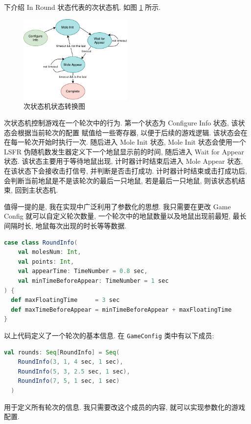 下介绍 In Round 状态代表的次状态机. 如图 \ref{fig:secondary-fsm} 所示.

\begin{figure}[htbp]
  \centering
  \includegraphics[width=0.5\textwidth]{res/img/secondary-fsm.pdf}
  \caption{次状态机状态转换图}
  \label{fig:secondary-fsm}
\end{figure}

次状态机控制游戏在一个轮次中的行为. 第一个状态为 Configure Info 状态, 该状态会根据当前轮次的配置
赋值给一些寄存器, 以便于后续的游戏逻辑. 该状态会在在每一轮次开始时执行一次. 随后进入 Mole Init 状态, 
Mole Init 状态会使用一个 LSFR 伪随机数发生器定义下一个地鼠显示前的时间, 随后进入 Wait for Appear 状态. 
该状态主要用于等待地鼠出现, 计时器计时结束后进入 Mole Appear 状态, 在该状态下会接收击打信号, 并判断是否击打成功.
计时器计时结束或击打成功后, 会判断当前地鼠是不是该轮次的最后一只地鼠, 若是最后一只地鼠, 则该状态机结束, 
回到主状态机. 

值得一提的是, 我在实现中广泛利用了参数化的思想. 我只需要在更改 Game Config 就可以自定义轮次数量, 
一个轮次中的地鼠数量以及地鼠出现前最短, 最长间隔时长, 地鼠每次出现的时长等等数据. 

\begin{lstlisting}[language=scala]
case class RoundInfo(
    val molesNum: Int,
    val points: Int,
    val appearTime: TimeNumber = 0.8 sec,
    val minTimeBeforeAppear: TimeNumber = 1 sec
) {
  def maxFloatingTime     = 3 sec
  def maxTimeBeforeAppear = minTimeBeforeAppear + maxFloatingTime
}
\end{lstlisting}

以上代码定义了一个轮次的基本信息. 在 \texttt{GameConfig} 类中有以下成员: 

\begin{lstlisting}[language=scala]
  val rounds: Seq[RoundInfo] = Seq(
    RoundInfo(3, 1, 4 sec, 1 sec),
    RoundInfo(5, 3, 2.5 sec, 1 sec),
    RoundInfo(7, 5, 1 sec, 1 sec)
  )
\end{lstlisting}
用于定义所有轮次的信息. 我只需要改这个成员的内容, 就可以实现参数化的游戏配置. 

